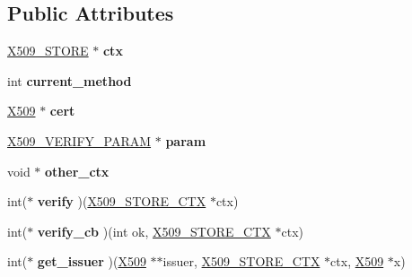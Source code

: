 \subsection*{Public Attributes}
\begin{DoxyCompactItemize}
\item 
\mbox{\label{structx509__store__ctx__st_ac633a0b046f10408d0becf0f1732ede5}} 
\hyperlink{structx509__store__st}{X509\+\_\+\+S\+T\+O\+RE} $\ast$ {\bfseries ctx}
\item 
\mbox{\label{structx509__store__ctx__st_a1bbea1b86bcb3d3f1a7d0bb05e67e860}} 
int {\bfseries current\+\_\+method}
\item 
\mbox{\label{structx509__store__ctx__st_aaf9dd5eda06f69f1a8b9f7606ee5c9b1}} 
\hyperlink{structx509__st}{X509} $\ast$ {\bfseries cert}
\item 
\mbox{\label{structx509__store__ctx__st_aacc66808b8d950db3d83395fdcd985b4}} 
\hyperlink{structX509__VERIFY__PARAM__st}{X509\+\_\+\+V\+E\+R\+I\+F\+Y\+\_\+\+P\+A\+R\+AM} $\ast$ {\bfseries param}
\item 
\mbox{\label{structx509__store__ctx__st_ab5ca1f66ed3e28f30ec7dc4df63ae78d}} 
void $\ast$ {\bfseries other\+\_\+ctx}
\item 
\mbox{\label{structx509__store__ctx__st_a40f028b2c848dc8df554ab89ac562fd1}} 
int($\ast$ {\bfseries verify} )(\hyperlink{structx509__store__ctx__st}{X509\+\_\+\+S\+T\+O\+R\+E\+\_\+\+C\+TX} $\ast$ctx)
\item 
\mbox{\label{structx509__store__ctx__st_a07d959e3a0cb959ec7c39bd7b8ee76eb}} 
int($\ast$ {\bfseries verify\+\_\+cb} )(int ok, \hyperlink{structx509__store__ctx__st}{X509\+\_\+\+S\+T\+O\+R\+E\+\_\+\+C\+TX} $\ast$ctx)
\item 
\mbox{\label{structx509__store__ctx__st_a5374f462a245a61de3aa7a7ccf18ddb9}} 
int($\ast$ {\bfseries get\+\_\+issuer} )(\hyperlink{structx509__st}{X509} $\ast$$\ast$issuer, \hyperlink{structx509__store__ctx__st}{X509\+\_\+\+S\+T\+O\+R\+E\+\_\+\+C\+TX} $\ast$ctx, \hyperlink{structx509__st}{X509} $\ast$x)
$$
\end{DoxyCompactItemize}
